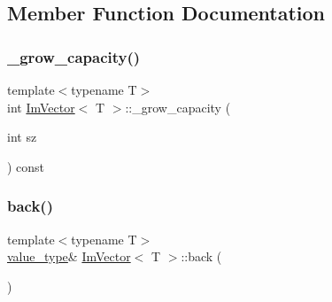 \subsection{Member Function Documentation}
\mbox{\label{class_im_vector_a3a097635d464b1b70dc7d59996a88b28}} 
\subsubsection{\texorpdfstring{\+\_\+grow\+\_\+capacity()}{\_grow\_capacity()}}
{\footnotesize\ttfamily template$<$typename T$>$ \\
int \mbox{\hyperlink{class_im_vector}{Im\+Vector}}$<$ T $>$\+::\+\_\+grow\+\_\+capacity (\begin{DoxyParamCaption}\item[{int}]{sz }\end{DoxyParamCaption}) const\hspace{0.3cm}{\ttfamily [inline]}}

\mbox{\label{class_im_vector_a3e4424d3fca190894598a6575f9d2401}} 
\subsubsection{\texorpdfstring{back()}{back()}\hspace{0.1cm}{\footnotesize\ttfamily [1/2]}}
{\footnotesize\ttfamily template$<$typename T$>$ \\
\mbox{\hyperlink{class_im_vector_a8bd77e4e7581d8e5f9e98d7c2f3c2a80}{value\+\_\+type}}\& \mbox{\hyperlink{class_im_vector}{Im\+Vector}}$<$ T $>$\+::back (\begin{DoxyParamCaption}{ }\end{DoxyParamCaption})\hspace{0.3cm}{\ttfamily [inline]}}

